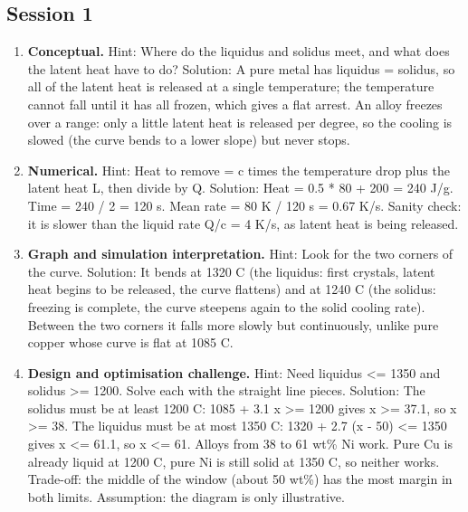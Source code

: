 \documentclass[11pt,a4paper]{article}
\begin{document}
\subsection*{Session 1}
\begin{enumerate}[nosep]
\item \textbf{Conceptual.} Hint: Where do the liquidus and solidus meet, and what does the latent heat have to do? Solution: A pure metal has liquidus = solidus, so all of the latent heat is released at a single temperature; the temperature cannot fall until it has all frozen, which gives a flat arrest. An alloy freezes over a range: only a little latent heat is released per degree, so the cooling is slowed (the curve bends to a lower slope) but never stops.
\item \textbf{Numerical.} Hint: Heat to remove = c times the temperature drop plus the latent heat L, then divide by Q. Solution: Heat = 0.5 * 80 + 200 = 240 J/g. Time = 240 / 2 = 120 s. Mean rate = 80 K / 120 s = 0.67 K/s. Sanity check: it is slower than the liquid rate Q/c = 4 K/s, as latent heat is being released.
\item \textbf{Graph and simulation interpretation.} Hint: Look for the two corners of the curve. Solution: It bends at 1320 C (the liquidus: first crystals, latent heat begins to be released, the curve flattens) and at 1240 C (the solidus: freezing is complete, the curve steepens again to the solid cooling rate). Between the two corners it falls more slowly but continuously, unlike pure copper whose curve is flat at 1085 C.
\item \textbf{Design and optimisation challenge.} Hint: Need liquidus \textless{}= 1350 and solidus \textgreater{}= 1200. Solve each with the straight line pieces. Solution: The solidus must be at least 1200 C: 1085 + 3.1 x \textgreater{}= 1200 gives x \textgreater{}= 37.1, so x \textgreater{}= 38. The liquidus must be at most 1350 C: 1320 + 2.7 (x - 50) \textless{}= 1350 gives x \textless{}= 61.1, so x \textless{}= 61. Alloys from 38 to 61 wt\% Ni work. Pure Cu is already liquid at 1200 C, pure Ni is still solid at 1350 C, so neither works. Trade-off: the middle of the window (about 50 wt\%) has the most margin in both limits. Assumption: the diagram is only illustrative.
\end{enumerate}
\end{document}
